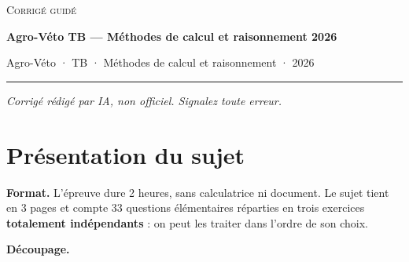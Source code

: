 \documentclass[11pt,a4paper]{article}
\begin{document}
\thispagestyle{plain}
\begin{center}
  {\small\scshape Corrigé guidé}\par\smallskip
  {\LARGE\bfseries Agro-Véto TB — Méthodes de calcul et raisonnement 2026\par}\medskip
  {\large Agro-Véto · TB · Méthodes de calcul et raisonnement · 2026\par}
\end{center}
\vspace{2pt}\hrule\vspace{8pt}

\emph{Corrigé rédigé par IA, non officiel. Signalez toute erreur.}

\hypertarget{pruxe9sentation-du-sujet}{%
\section{Présentation du sujet}\label{pruxe9sentation-du-sujet}}

\textbf{Format.} L'épreuve dure 2 heures, sans calculatrice ni document. Le sujet tient en 3 pages et compte 33 questions élémentaires réparties en trois exercices \textbf{totalement indépendants} : on peut les traiter dans l'ordre de son choix.

\textbf{Découpage.}
\end{document}
